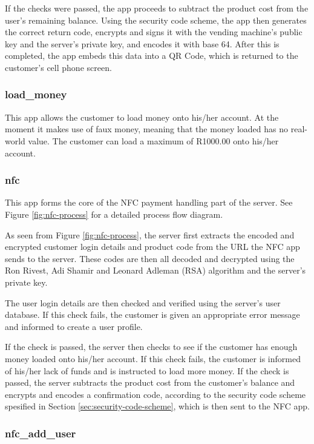 If the checks were passed, the app proceeds to subtract the product cost from the user's
remaining balance. Using the security code scheme, the app then generates the correct return
code, encrypts and signs it with the vending machine's public key and the server's private key,
and encodes it with base 64. After this is completed, the app embeds this data into a QR Code,
which is returned to the customer's cell phone screen. 

\subsubsection{load\_money}

This app allows the customer to load money onto his/her account. At the moment it makes use of
faux money, meaning that the money loaded has no real-world value. The customer can load a
maximum of R1000.00 onto his/her account.

\subsubsection{nfc}

This app forms the core of the NFC payment handling part of the server. See Figure
\ref{fig:nfc-process} for a detailed process flow diagram.

As seen from Figure \ref{fig:nfc-process}, the server first extracts the encoded and encrypted
customer login details and product code from the URL the NFC app sends to the server. These
codes are then all decoded and decrypted using the Ron Rivest, Adi Shamir and Leonard Adleman
(RSA) algorithm and the server's private key. 

The user login details are then checked and verified using the server's user database. If this
check fails, the customer is given an appropriate error message and informed to create a user
profile. 

If the check is passed, the server then checks to see if the customer has enough money loaded
onto his/her account. If this check fails, the customer is informed of his/her lack of funds
and is instructed to load more money. If the check is passed, the server subtracts the product
cost from the customer's balance and encrypts and encodes a confirmation code, according to the
security code scheme spesified in Section \ref{sec:security-code-scheme}, which is then sent
to the NFC app. 

\subsubsection{nfc\_add\_user}

